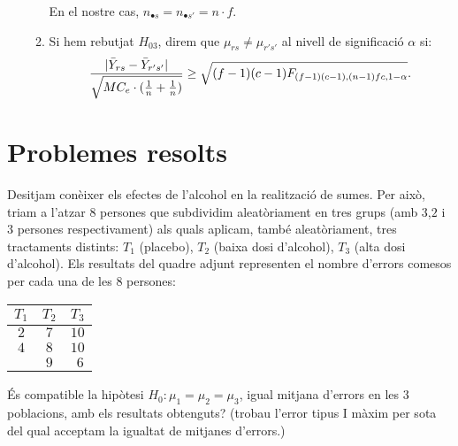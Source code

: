 \begin{enumerate}
\begin{enumerate}
En el nostre cas, $n_{\bullet s} = n_{\bullet s'} = n \cdot f$.

\item Si hem rebutjat $H_{03}$, direm que $\mu_{rs} \not = \mu_{r's'}$ al nivell
de significaci\'o $\alpha$ si:
$${|\bar{Y}_{rs} - \bar{Y}_{r's'}| \over \sqrt{MC_e \cdot ({1 \over n} + {1 \over
n})}} \geq \sqrt{(f-1)(c-1) F_{(f-1)(c-1),(n-1) f c,1-\alpha}}.$$
\end{enumerate}
\end{enumerate}

\section{Problemes resolts}

\begin{probres}
{Desitjam con\`eixer els efectes de
l'alcohol en la realitzaci\'o de sumes. Per aix\`o, triam
a l'atzar $8$ persones que subdividim aleat\`oriament en tres
grups (amb $3$,$2$ i $3$ persones respectivament) als quals
aplicam, tamb\'e aleat\`oriament, tres tractaments distints:
$T_1$ (placebo), $T_2$ (baixa dosi d'alcohol), $T_3$
(alta dosi d'alcohol). Els resultats del quadre adjunt
representen el nombre d'errors comesos per cada una de
les $8$ persones:
\begin{center}
\begin{tabular}{|c|c|c|}
\hline
$T_1$&$T_2$&$T_3$\\\hline\hline
$2$&$7$&$10$\\\hline
$4$&$8$&$10$\\\hline
 &$9$&$\ \,6$\\\hline
\end{tabular}
\end{center}
\'Es compatible la hip\`otesi
$H_0:\mu_1=\mu_2=\mu_3$, igual mitjana d'errors en les $3$
poblacions, amb els resultats obtenguts? (trobau l'error tipus I m\`axim 
per sota del qual acceptam la igualtat de mitjanes d'errors.)}
\end{probres}

